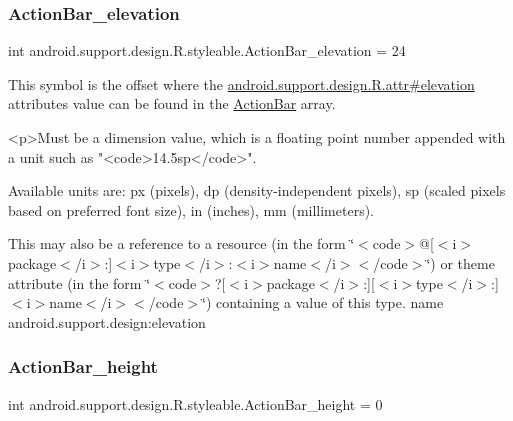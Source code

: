 \subsubsection{\texorpdfstring{Action\+Bar\+\_\+elevation}{ActionBar\_elevation}}
{\footnotesize\ttfamily int android.\+support.\+design.\+R.\+styleable.\+Action\+Bar\+\_\+elevation = 24\hspace{0.3cm}{\ttfamily [static]}}

This symbol is the offset where the \hyperlink{classandroid_1_1support_1_1design_1_1R_1_1attr_a5089b576eabe15b5d530b536c68a760d}{android.\+support.\+design.\+R.\+attr\#elevation} attribute\textquotesingle{}s value can be found in the \hyperlink{classandroid_1_1support_1_1design_1_1R_1_1styleable_ab795220a96557d11f8c21359b95bed82}{Action\+Bar} array.

\begin{DoxyVerb}      <p>Must be a dimension value, which is a floating point number appended with a unit such as "<code>14.5sp</code>".
\end{DoxyVerb}
 Available units are\+: px (pixels), dp (density-\/independent pixels), sp (scaled pixels based on preferred font size), in (inches), mm (millimeters). 

This may also be a reference to a resource (in the form \char`\"{}$<$code$>$@\mbox{[}$<$i$>$package$<$/i$>$\+:\mbox{]}$<$i$>$type$<$/i$>$\+:$<$i$>$name$<$/i$>$$<$/code$>$\char`\"{}) or theme attribute (in the form \char`\"{}$<$code$>$?\mbox{[}$<$i$>$package$<$/i$>$\+:\mbox{]}\mbox{[}$<$i$>$type$<$/i$>$\+:\mbox{]}$<$i$>$name$<$/i$>$$<$/code$>$\char`\"{}) containing a value of this type.  name android.\+support.\+design\+:elevation \mbox{\label{classandroid_1_1support_1_1design_1_1R_1_1styleable_a7e935cdf4fb18cfcd8e0e46a55688835}} 
\subsubsection{\texorpdfstring{Action\+Bar\+\_\+height}{ActionBar\_height}}
{\footnotesize\ttfamily int android.\+support.\+design.\+R.\+styleable.\+Action\+Bar\+\_\+height = 0\hspace{0.3cm}{\ttfamily [static]}}

